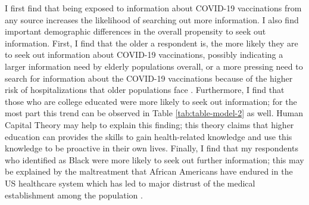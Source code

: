 I first find that being exposed to information about COVID-19 vaccinations from any 
source increases the likelihood of searching out more information. I
also find important demographic differences in the overall propensity to seek
out information. First, I find that the older a respondent is, the more likely
they are to seek out information about COVID-19 vaccinations, possibly
indicating a larger information need by elderly populations overall, or a more
pressing need to search for information about the COVID-19 vaccinations because
of the higher risk of hospitalizations that older populations face
\citep{turner_etal18}. Furthermore, I find that those who are college educated were
more likely to seek out information; for the most part this trend can be
observed in Table \ref{tab:table-model-2} as well. Human Capital Theory
\citep{mirowsky_ross98} may help to explain this finding; this theory claims that
higher education can provides the skills to gain health-related knowledge and
use this knowledge to be proactive in their own lives. Finally, I find that my
respondents who identified as Black were more likely to seek out further
information; this may be explained by the maltreatment that African Americans
have endured in the US healthcare system \citep{baileyStructuralRacismHealth2017}
which has led to major distrust of the medical establishment among the
population \citep{center2019, murray15, bronson2014don}.

